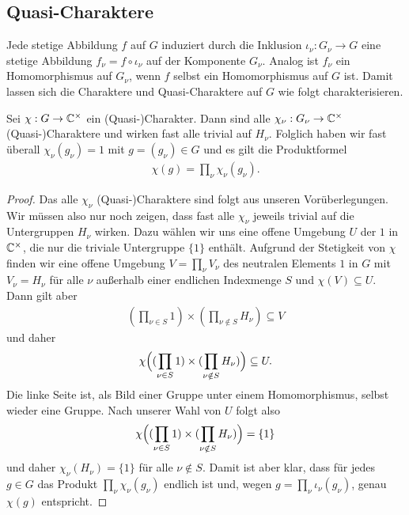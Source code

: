 \subsection{Quasi-Charaktere}
		Jede stetige Abbildung $f$ auf $G$ induziert durch die Inklusion $\iota_\nu: G_\nu \to G$ eine stetige Abbildung $f_\nu = f \circ \iota_\nu$ auf der Komponente $G_\nu$.
		Analog ist $f_\nu$ ein Homomorphismus auf $G_\nu$, wenn $f$ selbst ein Homomorphismus auf $G$ ist.
		Damit lassen sich die Charaktere und Quasi-Charaktere auf $G$ wie folgt charakterisieren.
		\begin{lemma}\label{lemma:rdp:char}
			Sei $\chi:G \to \mathbb{C}^\times$ ein (Quasi-)Charakter. 
			Dann sind alle $\chi_\nu: G_\nu \to \mathbb{C}^\times$ (Quasi-)Charaktere und wirken fast alle trivial auf $H_\nu$.
			Folglich haben wir fast überall $\chi_\nu (g_\nu) = 1$ mit $g=(g_\nu)\in G$ und es gilt die Produktformel
			\begin{align*}
				\chi(g) = \prod_\nu \chi_\nu(g_\nu).
			\end{align*}
		\end{lemma}
		\begin{proof}
			Das alle $\chi_\nu$ (Quasi-)Charaktere sind folgt aus unseren Vorüberlegungen.
			Wir müssen also nur noch zeigen, dass fast alle $\chi_\nu$ jeweils trivial auf die Untergruppen $H_\nu$ wirken. 
			Dazu wählen wir uns eine offene Umgebung $U$ der $1$ in $\mathbb{C}^\times$, die nur die triviale Untergruppe $\{1\}$ enthält. 
			Aufgrund der Stetigkeit von $\chi$ finden wir eine offene Umgebung $V=\prod_\nu V_\nu$ des neutralen Elements $1$ in $G$ mit $V_\nu = H_\nu$ für alle $\nu$ außerhalb einer endlichen Indexmenge $S$ und $\chi(V)\subseteq U$.
			Dann gilt aber
			\begin{align*}
				(\prod_{\nu\in S} 1) \times (\prod_{\nu \notin S} H_\nu) \subseteq V 
			\end{align*}
			und daher
			\begin{align*}
				\chi\Bigl((\prod_{\nu\in S} 1) \times (\prod_{\nu \notin S} H_\nu)\Bigr) \subseteq U .
			\end{align*}
			Die linke Seite ist, als Bild einer Gruppe unter einem Homomorphismus, selbst wieder eine Gruppe. 
			Nach unserer Wahl von $U$ folgt also
			\begin{align*}
				\chi\Bigl((\prod_{\nu\in S} 1) \times (\prod_{\nu \notin S} H_\nu)\Bigr) = \{1\}
			\end{align*}
			und daher $\chi_\nu (H_\nu) = \{1\}$ für alle $\nu\notin S$. 
			Damit ist aber klar, dass für jedes $g \in G$ das Produkt $\prod_\nu \chi_\nu(g_\nu)$ endlich ist und, wegen $g = \prod_{\nu} \iota_\nu(g_\nu)$, genau $\chi(g)$ entspricht.
			
		\end{proof}
